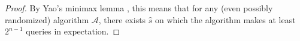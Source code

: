 \begin{proof}
    By Yao's minimax lemma \citep{yao1977probabilistic}, this means that for any (even possibly randomized) algorithm $\mathcal{A}$, there exists $\hat{s}$ on which the algorithm makes at least $2^{n-1}$ queries in expectation.  
\end{proof}


